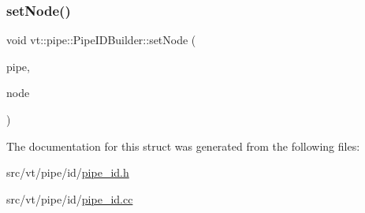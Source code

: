 \subsubsection{\texorpdfstring{set\+Node()}{setNode()}}
{\footnotesize\ttfamily void vt\+::pipe\+::\+Pipe\+I\+D\+Builder\+::set\+Node (\begin{DoxyParamCaption}\item[{\hyperlink{namespacevt_ac9852acda74d1896f48f406cd72c7bd3}{Pipe\+Type} \&}]{pipe,  }\item[{\hyperlink{namespacevt_a866da9d0efc19c0a1ce79e9e492f47e2}{Node\+Type} const \&}]{node }\end{DoxyParamCaption})\hspace{0.3cm}{\ttfamily [static]}}



The documentation for this struct was generated from the following files\+:\begin{DoxyCompactItemize}
\item 
src/vt/pipe/id/\hyperlink{pipe__id_8h}{pipe\+\_\+id.\+h}\item 
src/vt/pipe/id/\hyperlink{pipe__id_8cc}{pipe\+\_\+id.\+cc}\end{DoxyCompactItemize}
